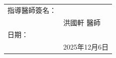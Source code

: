 \documentclass[12pt,a4paper]{article}
\begin{document}
\vspace{1cm}
\noindent
\begin{tabular}{ll}
指導醫師簽名：& \underline{\hspace{4cm}} \\
& 洪國軒 醫師 \\[0.5cm]
日期：& \underline{\hspace{4cm}} \\
& 2025年12月6日
\end{tabular}
\end{document}
